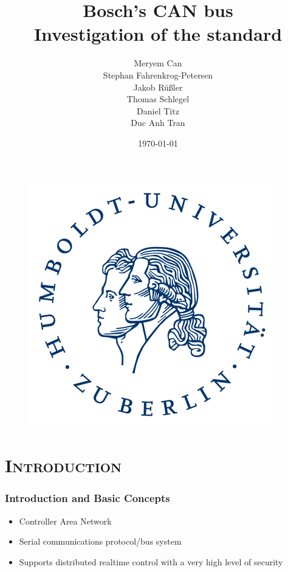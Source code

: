 \documentclass[xcolor=x11names,compress]{beamer}
\renewcommand{\(}{\begin{columns}}
\renewcommand{\)}{\end{columns}}
\newcommand{\<}[1]{\begin{column}{#1}}
\renewcommand{\>}{\end{column}}
\begin{document}
\begin{frame}[plain]
  \begin{figure}
    \flushright
      \includegraphics[scale=0.12]{hu_logo}
    \vspace*{-0.4cm}
  \end{figure}

  \title{\textbf{Bosch's CAN bus\\Investigation of the standard}\\\vspace{0.2cm}}

  \author{Meryem Can\\Stephan Fahrenkrog-Petersen\\Jakob Rüßler\\Thomas Schlegel\\
  Daniel Titz\\Duc Anh Tran\\\vspace{0.3cm}}


\date{\today}
\titlepage
\end{frame}


\section{\scshape Introduction}
\begin{frame}
  \frametitle{Introduction and Basic Concepts}
  \begin{itemize}
      \item Controller Area Network 
      \item Serial communications protocol/bus system
      \item Supports distributed realtime control with a very high level of security  ~\cite{can}
   
  \end{itemize}

\end{frame}
\end{document}
